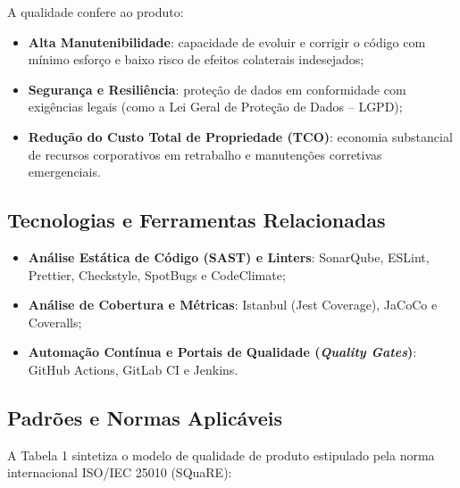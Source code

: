 \documentclass[12pt,a4paper]{article}
\begin{document}
A qualidade confere ao produto:
\begin{itemize}
    \item \textbf{Alta Manutenibilidade}: capacidade de evoluir e corrigir o código com mínimo esforço e baixo risco de efeitos colaterais indesejados;
    \item \textbf{Segurança e Resiliência}: proteção de dados em conformidade com exigências legais (como a Lei Geral de Proteção de Dados -- LGPD);
    \item \textbf{Redução do Custo Total de Propriedade (TCO)}: economia substancial de recursos corporativos em retrabalho e manutenções corretivas emergenciais.
\end{itemize}

\subsection{Tecnologias e Ferramentas Relacionadas}
\begin{itemize}
    \item \textbf{Análise Estática de Código (SAST) e Linters}: SonarQube, ESLint, Prettier, Checkstyle, SpotBugs e CodeClimate;
    \item \textbf{Análise de Cobertura e Métricas}: Istanbul (Jest Coverage), JaCoCo e Coveralls;
    \item \textbf{Automação Contínua e Portais de Qualidade (\textit{Quality Gates})}: GitHub Actions, GitLab CI e Jenkins.
\end{itemize}

\subsection{Padrões e Normas Aplicáveis}
A Tabela 1 sintetiza o modelo de qualidade de produto estipulado pela norma internacional ISO/IEC 25010 (SQuaRE):
\end{document}
